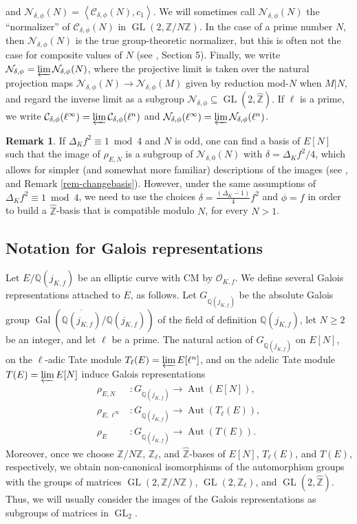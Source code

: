 \documentclass[11pt]{amsart}
\theoremstyle{definition}
\newtheorem{remark}[defn]{Remark}
\newcommand{\Q}{\mathbb{Q}}
\newcommand{\Z}{\mathbb{Z}}
\newcommand{\cC}{\mathcal{C}}
\newcommand{\OO}{\mathcal{O}}
\newcommand{\Gal}{\operatorname{Gal}}
\newcommand{\Aut}{\operatorname{Aut}}
\newcommand{\GL}{\operatorname{GL}}
\begin{document}
and $\mathcal{N}_{\delta,\phi}(N) = \left\langle \cC_{\delta,\phi}(N),c_1\right\rangle$. We will sometimes call $\mathcal{N}_{\delta,\phi}(N)$ the ``normalizer'' of $\cC_{\delta,\phi}(N)$ in $\GL(2,\Z/N\Z)$. In the case of a prime number $N$, then $\mathcal{N}_{\delta,\phi}(N)$ is the true group-theoretic normalizer, but this is often not the case for composite values of $N$ (see \cite{lozano-galoiscm}, Section 5). Finally, we write $\mathcal{N}_{\delta,\phi} = \varprojlim \mathcal{N}_{\delta,\phi}(N)$, where the projective limit is taken over the natural projection maps $\mathcal{N}_{\delta,\phi}(N)\to \mathcal{N}_{\delta,\phi}(M)$ given by reduction mod-$N$ when $M|N$, and regard the inverse limit as a subgroup $\mathcal{N}_{\delta,\phi}\subseteq \GL(2,\widehat{\Z})$. If $\ell$ is a prime, we write  $\cC_{\delta,\phi}(\ell^{\infty}) = \varprojlim \cC_{\delta,\phi}(\ell^n)$ and $\mathcal{N}_{\delta,\phi}(\ell^{\infty}) = \varprojlim \mathcal{N}_{\delta,\phi}(\ell^n)$.

\begin{remark}
    If $\Delta_Kf^2\equiv 1 \bmod 4$ and $N$ is odd, one can find a basis of $E[N]$ such that the image of $\rho_{E,N}$ is a subgroup of $\mathcal{N}_{\delta,0}(N)$ with $\delta=\Delta_Kf^2/4$, which allows for simpler (and somewhat more familiar) descriptions of the images (see \cite[Thm. 1.1]{lozano-galoiscm}, and  Remark \ref{rem-changebasis}). However, under the same assumptions of $\Delta_Kf^2\equiv 1 \bmod 4$, we need to use the choices $\delta=\frac{(\Delta_K-1)}{4}f^2$ and $\phi=f$ in order to build a  $\widehat{\Z}$-basis that is compatible modulo $N$, for every $N>1$.
\end{remark}

\subsection{Notation for Galois representations}\label{sec-galoisrepnotation}
Let $E/\Q(j_{K,f})$ be an elliptic curve with CM by $\OO_{K,f}$. We define several Galois representations attached to $E$, as follows. Let  $G_{\Q(j_{K,f})}$  be the absolute Galois group $\Gal(\overline{\Q(j_{K,f})}/\Q(j_{K,f}))$ of the field of definition $\Q(j_{K,f})$, let $N\geq 2$ be an integer, and let $\ell$ be a prime. The natural action of $G_{\Q(j_{K,f})}$ on $E[N]$, on the $\ell$-adic  Tate module $T_\ell(E)=\varprojlim E[\ell^n]$, and on the adelic Tate module $T(E)=\varprojlim E[N]$ induce Galois representations
\begin{align*}
    \rho_{E,N} &\colon G_{\Q(j_{K,f})} \to \Aut(E[N]),\\
    \rho_{E,\ell^\infty} &\colon G_{\Q(j_{K,f})} \to \Aut(T_\ell(E)),\\
    \rho_{E} &\colon G_{\Q(j_{K,f})} \to \Aut(T(E)).
\end{align*}
Moreover, once we choose $\Z/N\Z$, $\Z_\ell$, and $\widehat{\Z}$-bases of $E[N]$, $T_\ell(E)$, and $T(E)$, respectively, we obtain non-canonical isomorphisms of the automorphism groups with the groups of matrices $\GL(2,\Z/N\Z)$, $\GL(2,\Z_\ell)$, and $\GL(2,\widehat{\Z})$. Thus, we will usually consider the images of the Galois representations as subgroups of matrices in $\GL_2$.  
\end{document}
